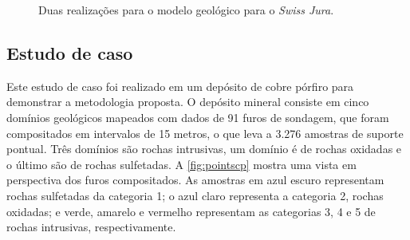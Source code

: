 \begin{figure}[H] 
    \centering
    \caption{Duas realizações para o modelo geológico para o \textit{Swiss Jura}.} \label{fig:jura_reals}
     \hspace{1em}
\end{figure}

\subsection{Estudo de caso}

Este estudo de caso foi realizado em um depósito de cobre pórfiro para demonstrar a metodologia proposta. O depósito mineral consiste em cinco domínios geológicos mapeados com dados de 91 furos de sondagem, que foram compositados em intervalos de 15 metros, o que leva a 3.276 amostras de suporte pontual. Três domínios são rochas intrusivas, um domínio é de rochas oxidadas e o último são de rochas sulfetadas. A \ref{fig:pointscp} mostra uma vista em perspectiva dos furos compositados. As amostras em azul escuro representam rochas sulfetadas da categoria 1; o azul claro representa a categoria 2, rochas oxidadas; e verde, amarelo e vermelho representam as categorias 3, 4 e 5 de rochas intrusivas, respectivamente.

